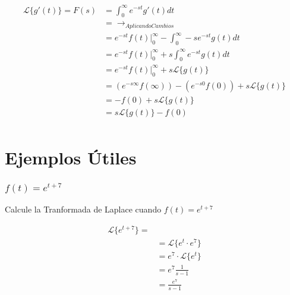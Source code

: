 \documentclass[12pt]{report}                                %
\begin{document}
            \begin{equation*}   
            \begin{split}
                    \mathscr{L}\{g'(t)\} = F(s) 
                            & = \int_0^\infty e^{-st} g'(t) dt                                      \\
                            & = \to_{Aplicando Cambios}                                             \\
                            & = e^{-st} f(t)|_0^\infty - \int_0^\infty -se^{-st} g(t) dt            \\
                            & = e^{-st} f(t)|_0^\infty + s\int_0^\infty e^{-st} g(t) dt             \\
                            & = e^{-st} f(t)|_0^\infty + s\mathscr{L}\{g(t)\}                       \\
                            & = (e^{-s\infty} f(\infty))-(e^{-s0} f(0)) + s\mathscr{L}\{g(t)\}      \\
                            & = -f(0) + s\mathscr{L}\{g(t)\}                                        \\
                            & = s\mathscr{L}\{g(t)\} -f(0)                                          \\
            \end{split}
            \end{equation*}

    \clearpage
    \section{Ejemplos Útiles}

        \subsubsection{$f(t) = e^{t+7}$}
            Calcule la Tranformada de Laplace cuando $f(t) = e^{t+7}$

            \begin{equation*}   
            \begin{split}
                \mathscr{L}\{e^{t+7}\}  =                                                       \\
                            & = \mathscr{L} \{ e^t \cdot e^7 \}                                 \\
                            & = e^7 \cdot \mathscr{L} \{ e^t \}                                 \\
                            & = e^7 \frac{1}{s-1}                                               \\
                            & = \frac{e^7}{s-1}                                                 \\
            \end{split}
            \end{equation*}
\end{document}
